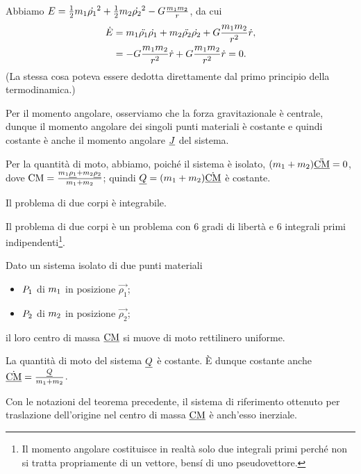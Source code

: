 \Proof Abbiamo $E = \frac{1}{2}m_1\dot{\rho_1}^2 + \frac{1}{2}m_2\dot{\rho_2}^2 - G \frac{m_1m_2}{r}$, da cui
\begin{align*}
	\dot{E}
	&= m_1\ddot{\rho_1}\dot{\rho_1} + m_2\ddot{\rho_2}\dot{\rho_2} + G \frac{m_1m_2}{r^2} \dot{r},\\
	&= - G \frac{m_1m_2}{r^2}\dot{r} + G \frac{m_1m_2}{r^2} \dot{r} = 0.
\end{align*}
(La stessa cosa poteva essere dedotta direttamente dal primo principio della termodinamica.)
\par Per il momento angolare, osserviamo che la forza gravitazionale \`e centrale, dunque il momento angolare dei singoli punti materiali \`e costante e quindi costante \`e anche il momento angolare $\underline{J}$ del sistema.
\par Per la quantit\`a di moto, abbiamo, poich\'e il sistema \`e isolato, $(m_1 + m_2) \ddot{\underline{\text{CM}}} = 0$, dove $\text{CM} = \frac{m_1\underline{\rho_1} + m_2\underline{\rho_2}}{m_1 + m_2}$; quindi $\underline{Q} = (m_1 + m_2) \dot{\underline{\text{CM}}}$ \`e costante. \EndProof
\begin{Corollary}
	Il problema di due corpi \`e integrabile.
\end{Corollary}
\Proof Il problema di due corpi \`e un problema con $6$ gradi di libert\`a e $6$ integrali primi indipendenti\footnote{Il momento angolare costituisce in realt\`a solo due integrali primi perch\'e non si tratta propriamente di un vettore, bens\'i di uno pseudovettore.}. \EndProof
\begin{Theorem}
	Dato un sistema isolato di due punti materiali
	\begin{itemize}
		\item $P_1$ di $m_1$ in posizione $\vec{\rho_1}$;
		\item $P_2$ di $m_2$ in posizione $\vec{\rho_2}$;
	\end{itemize}
	il loro centro di massa $\underline{\text{CM}}$ si muove di moto rettilinero uniforme.
\end{Theorem}
\Proof La quantit\`a di moto del sistema $\underline{Q}$ \`e costante. \`E dunque costante anche $\dot{\underline{\text{CM}}} = \frac{\underline{Q}}{m_1 + m_2}$. \EndProof
\begin{Corollary}
	Con le notazioni del teorema precedente, il sistema di riferimento ottenuto per traslazione dell'origine nel centro di massa $\underline{\text{CM}}$ \`e anch'esso inerziale.
\end{Corollary}
